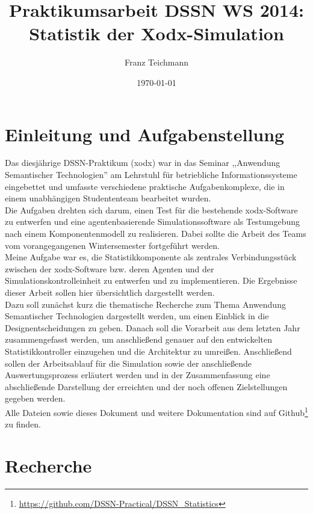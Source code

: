 \documentclass{article}
\title{Praktikumsarbeit DSSN WS 2014: \\ Statistik der Xodx-Simulation}
\author{Franz Teichmann}
\date{\today}
\begin{document}
\maketitle

\tableofcontents
\newpage


\section{Einleitung und Aufgabenstellung}


Das diesjährige DSSN-Praktikum (xodx) war in das Seminar ,,Anwendung Semantischer Technologien'' am Lehrstuhl für betriebliche Informationssysteme eingebettet und umfasste verschiedene praktische Aufgabenkomplexe,
die in einem unabhängigen Studententeam bearbeitet wurden.\\
Die Aufgaben drehten sich darum, einen Test für die bestehende xodx-Software zu entwerfen und eine agentenbasierende Simulationssoftware als Testumgebung nach einem Komponentenmodell zu realisieren. Dabei sollte die Arbeit des Teams vom vorangegangenen Wintersemester fortgeführt werden.\\
Meine Aufgabe war es, die Statistikkomponente als zentrales Verbindungsstück zwischen der xodx-Software bzw. deren Agenten und der Simulationskontrolleinheit zu entwerfen und zu implementieren. Die Ergebnisse dieser Arbeit sollen hier übersichtlich dargestellt werden.\\
Dazu soll zunächst kurz die thematische Recherche zum Thema Anwendung Semantischer Technologien dargestellt werden, um einen Einblick in die Designentscheidungen zu geben. Danach soll die Vorarbeit aus dem letzten Jahr zusammengefasst werden, um anschließend genauer auf den entwickelten Statistikkontroller einzugehen und die Architektur zu umreißen. Anschließend sollen der Arbeitsablauf für die Simulation sowie der anschließende Auswertungsprozess erläutert werden und in der Zusammenfassung eine abschließende Darstellung der erreichten und der noch offenen Zielstellungen gegeben werden.\\
Alle Dateien sowie dieses Dokument und weitere Dokumentation sind auf Github\footnote{\url{https://github.com/DSSN-Practical/DSSN_Statistics}} zu finden.

\section{Recherche}
\end{document}
